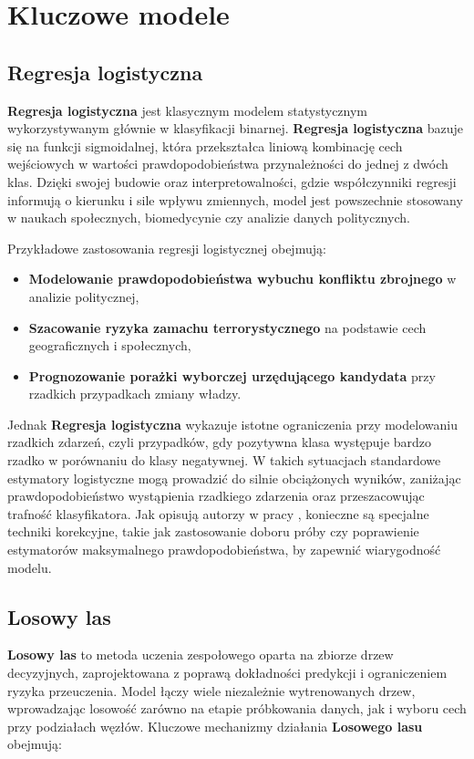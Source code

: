 \section{Kluczowe modele}
\subsection{Regresja logistyczna}

\textbf{Regresja logistyczna} jest klasycznym modelem statystycznym wykorzystywanym głównie w klasyfikacji binarnej. \textbf{Regresja logistyczna} bazuje się na funkcji sigmoidalnej, która przekształca liniową kombinację cech wejściowych w wartości prawdopodobieństwa przynależności do jednej z dwóch klas. Dzięki swojej budowie oraz interpretowalności, gdzie współczynniki regresji informują o kierunku i sile wpływu zmiennych, model jest powszechnie stosowany w naukach społecznych, biomedycynie czy analizie danych politycznych.

Przykładowe zastosowania regresji logistycznej obejmują:

\begin{itemize}
	\item \textbf{Modelowanie prawdopodobieństwa wybuchu konfliktu zbrojnego} w analizie politycznej,
	\item \textbf{Szacowanie ryzyka zamachu terrorystycznego} na podstawie cech geograficznych i społecznych,
	\item \textbf{Prognozowanie porażki wyborczej urzędującego kandydata} przy rzadkich przypadkach zmiany władzy.
\end{itemize}

Jednak \textbf{Regresja logistyczna} wykazuje istotne ograniczenia przy modelowaniu rzadkich zdarzeń, czyli przypadków, gdy pozytywna klasa występuje bardzo rzadko w porównaniu do klasy negatywnej. W takich sytuacjach standardowe estymatory logistyczne mogą prowadzić do silnie obciążonych wyników, zaniżając prawdopodobieństwo wystąpienia rzadkiego zdarzenia oraz przeszacowując trafność klasyfikatora. Jak opisują autorzy w pracy \cite{Regresja_logistyczna}, konieczne są specjalne techniki korekcyjne, takie jak zastosowanie doboru próby czy poprawienie estymatorów maksymalnego prawdopodobieństwa, by zapewnić wiarygodność modelu.

\subsection{Losowy las}

\textbf{Losowy las} to metoda uczenia zespołowego oparta na zbiorze drzew decyzyjnych, zaprojektowana z poprawą dokładności predykcji i ograniczeniem ryzyka przeuczenia. Model łączy wiele niezależnie wytrenowanych drzew, wprowadzając losowość zarówno na etapie próbkowania danych, jak i wyboru cech przy podziałach węzłów. Kluczowe mechanizmy działania \textbf{Losowego lasu} obejmują:

